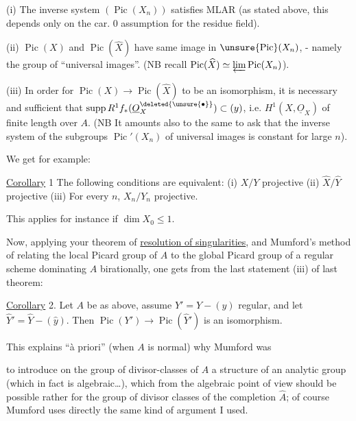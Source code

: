 (i) The inverse system $(\operatorname{Pic}(X_n))$ satisfies MLAR (as stated above, this depends only on the car. 0 assumption for the residue field).

(ii) $\operatorname{Pic}(X)$ and $\operatorname{Pic}(\widehat{X})$ have same image in $\unsure{\operatorname{Pic}}(X_n)$, - namely the group of ``universal images''. (NB recall $\operatorname{Pic}(\widehat{X})\simeq\varprojlim\operatorname{Pic}(X_n)$).

(iii) In order for $\operatorname{Pic}(X)\longrightarrow\operatorname{Pic}(\widehat{X})$ to be an isomorphism, it is necessary and sufficient that $\operatorname{supp}R^1f_*(\underline{O}_X^{\deleted{\unsure{\bullet}}})\subset(y)$, i.e. $H^1(X,\underline{O}_X)$ of finite length over $A$. (NB It amounts also to the same to  ask that the inverse system of the subgroups $\operatorname{Pic}'(X_n)$ of universal images is constant for large $n$).

We get for example:

\uline{Corollary} 1 The following conditions are equivalent: (i) $X/Y$ projective (ii) $\widehat{X}/\widehat{Y}$ projective (iii) For every $n$, $X_n/Y_n$ projective.

This applies for instance if $\dim X_0\leq1$.

Now, applying your theorem of \uline{resolution of singularities}, and Mumford's method of relating the local Picard group of $A$ to the global Picard group of a regular scheme dominating $A$ birationally, one gets from the last statement  (iii) of last theorem:

\uline{Corollary} 2. Let $A$ be as above, assume  $Y'=Y-(y)$ regular, and let $\widehat{Y}'=\widehat{Y}-(\widehat{y})$. Then $\operatorname{Pic}(Y')\longrightarrow\operatorname{Pic}(\widehat{Y}')$ is an isomorphism.

This explains ``à priori'' (when $A$ is normal) why Mumford was



 to introduce  on the group of divisor-classes of $A$ a structure of an analytic group (which in fact is algebraic\ldots), which from the algebraic point of view should be possible rather for the group of divisor classes of the completion $\widehat{A}$; of course Mumford uses directly the same kind of argument I used.

